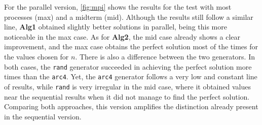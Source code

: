 For the parallel version, \cref{fig:mpi} shows the results for the test with most processes (max) and a midterm (mid). Although the results still follow a similar line, \textbf{Alg1} obtained slightly better solutions in parallel, being this more noticeable in the max case. As for \textbf{Alg2}, the mid case already shows a clear improvement, and the max case obtains the perfect solution most of the times for the values chosen for $n$.
There is also a difference between the two generators. In both cases, the \texttt{rand} generator succeeded in achieving the perfect solution more times than the \texttt{arc4}. Yet, the \texttt{arc4} generator follows a very low and constant line of results, while \texttt{rand} is very irregular in the mid case, where it obtained values near the sequential results when it did not manage to find the perfect solution. Comparing both approaches, this version amplifies the distinction already present in the sequential version.

